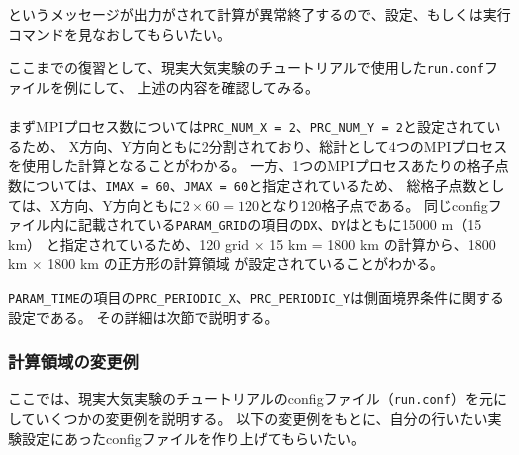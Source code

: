 \noindent というメッセージが出力がされて計算が異常終了するので、設定、もしくは実行コマンドを見なおしてもらいたい。

ここまでの復習として、現実大気実験のチュートリアルで使用した\verb|run.conf|ファイルを例にして、
上述の内容を確認してみる。\\

\\

\noindent まずMPIプロセス数については\verb|PRC_NUM_X = 2|、\verb|PRC_NUM_Y = 2|と設定されているため、
X方向、Y方向ともに2分割されており、総計として4つのMPIプロセスを使用した計算となることがわかる。
一方、1つのMPIプロセスあたりの格子点数については、\verb|IMAX = 60|、\verb|JMAX = 60|と指定されているため、
総格子点数としては、X方向、Y方向ともに$2 \times 60 = 120$となり120格子点である。
同じconfigファイル内に記載されている\verb|PARAM_GRID|の項目の\verb|DX|、\verb|DY|はともに15000 m（15 km）
と指定されているため、120 grid $\times$ 15 km = 1800 km の計算から、1800 km $\times$ 1800 km の正方形の計算領域
が設定されていることがわかる。

\verb|PARAM_TIME|の項目の\verb|PRC_PERIODIC_X|、\verb|PRC_PERIODIC_Y|は側面境界条件に関する設定である。
その詳細は次節で説明する。


\subsubsection{計算領域の変更例}
ここでは、現実大気実験のチュートリアルのconfigファイル（\verb|run.conf|）を元にしていくつかの変更例を説明する。
以下の変更例をもとに、自分の行いたい実験設定にあったconfigファイルを作り上げてもらいたい。\\


